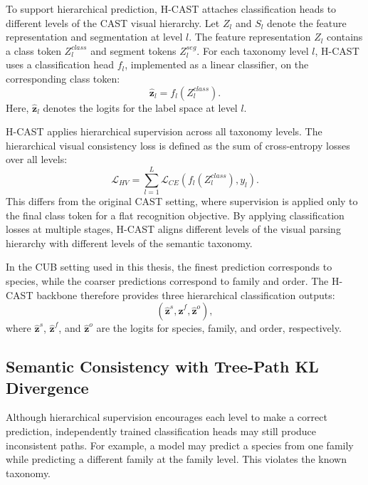To support hierarchical prediction, H-CAST attaches classification heads to different levels of the CAST visual hierarchy. Let \(Z_l\) and \(S_l\) denote the feature representation and segmentation at level \(l\). The feature representation \(Z_l\) contains a class token \(Z_l^{class}\) and segment tokens \(Z_l^{seg}\). For each taxonomy level \(l\), H-CAST uses a classification head \(f_l\), implemented as a linear classifier, on the corresponding class token:
\begin{equation}
    \hat{\mathbf{z}}_l = f_l(Z_l^{class}).
\end{equation}
Here, \(\hat{\mathbf{z}}_l\) denotes the logits for the label space at level \(l\).

H-CAST applies hierarchical supervision across all taxonomy levels. The hierarchical visual consistency loss is defined as the sum of cross-entropy losses over all levels:
\begin{equation}
    \mathcal{L}_{HV}
    =
    \sum_{l=1}^{L}
    \mathcal{L}_{CE}
    \left(
        f_l(Z_l^{class}), y_l
    \right).
\end{equation}
This differs from the original CAST setting, where supervision is applied only to the final class token for a flat recognition objective. By applying classification losses at multiple stages, H-CAST aligns different levels of the visual parsing hierarchy with different levels of the semantic taxonomy.

In the CUB setting used in this thesis, the finest prediction corresponds to species, while the coarser predictions correspond to family and order. The H-CAST backbone therefore provides three hierarchical classification outputs:
\begin{equation}
    (\hat{\mathbf{z}}^{s}, \hat{\mathbf{z}}^{f}, \hat{\mathbf{z}}^{o}),
\end{equation}
where \(\hat{\mathbf{z}}^{s}\), \(\hat{\mathbf{z}}^{f}\), and \(\hat{\mathbf{z}}^{o}\) are the logits for species, family, and order, respectively.

\subsection{Semantic Consistency with Tree-Path KL Divergence}

Although hierarchical supervision encourages each level to make a correct prediction, independently trained classification heads may still produce inconsistent paths. For example, a model may predict a species from one family while predicting a different family at the family level. This violates the known taxonomy.

